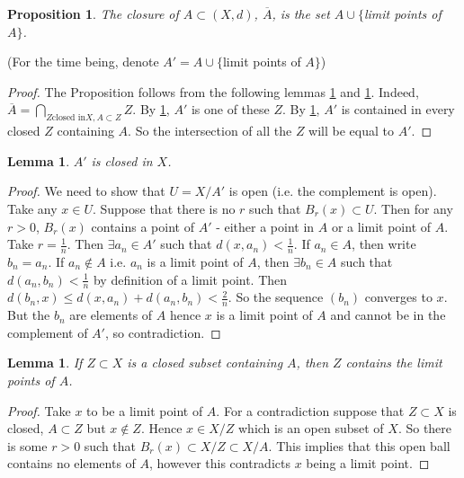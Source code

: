 \documentclass{article}
\theoremstyle{definition}
\theoremstyle{plain}%
\newtheorem{lem}[thm]{Lemma}
\newtheorem{prop}[thm]{Proposition}
\theoremstyle{remark}
\newcommand{\union}{\cup}
\begin{document}
\begin{prop}
The closure of $A \subset (X,d)$, $\overline{A}$, is the set $A \union \{$limit points of $A\}$.
\end{prop}


(For the time being, denote $A' = A \union \{$limit points of $A\}$)

\begin{proof}
The Proposition follows from the following lemmas \ref{lem a clos} and \ref{lem b clos}. Indeed, $\overline{A} = \bigcap_{Z \text{closed in} X, A \subset Z}Z$. By \ref{lem a clos}, $A'$ is one of these $Z$. By \ref{lem b clos}, $A'$ is contained in every closed $Z$ containing $A$. So the intersection of all the $Z$ will be equal to $A'$.
\end{proof}


\begin{lem}\label{lem a clos}
$A'$ is closed in $X$.
\end{lem}

\begin{proof}
We need to show that $U = X / A'$ is open (i.e. the complement is open). Take any $x \in U$. Suppose that there is no $r$ such that $B_r(x) \subset U$. Then for any $r > 0$, $B_r(x)$ contains a point of $A'$ - either a point in $A$ or a limit point of $A$. Take $r = \frac{1}{n}$. Then $\exists a_n \in A'$ such that $d(x,a_n) < \frac{1}{n}$. If $a_n \in A$, then write $b_n = a_n$. If $a_n \not\in A$ i.e. $a_n$ is a limit point of $A$, then $\exists b_n \in A$ such that $d(a_n, b_n) < \frac{1}{n}$ by definition of a limit point. Then $d(b_n, x) \le d(x,a_n) + d(a_n, b_n) < \frac{2}{n}$. So the sequence $(b_n)$ converges to $x$. But the $b_n$ are elements of $A$ hence $x$ is a limit point of $A$ and cannot be in the complement of $A'$, so contradiction.
\end{proof}

\begin{lem}\label{lem b clos}
If $Z \subset X$ is a closed subset containing $A$, then $Z$ contains the limit points of $A$.
\end{lem}

\begin{proof}
Take $x$ to be a limit point of $A$. For a contradiction suppose that $Z \subset X$ is closed, $A \subset Z$ but $x \not\in Z$. Hence $x \in X / Z$ which is an open subset of $X$. So there is some $r > 0$ such that $B_r(x) \subset X/Z \subset X/A$. This implies that this open ball contains no elements of $A$, however this contradicts $x$ being a limit point.
\end{proof}
\end{document}
